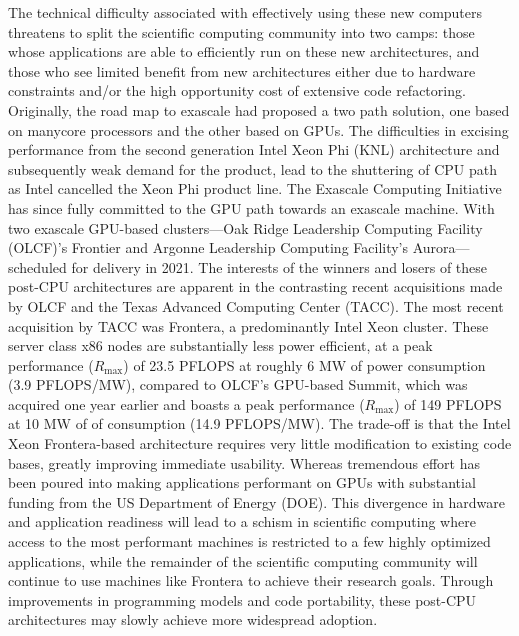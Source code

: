 The technical difficulty associated with effectively using these new computers threatens to split the scientific computing community into two camps: those whose applications are able to efficiently run on these new architectures, and those who see limited benefit from new architectures either due to hardware constraints and/or the high opportunity cost of extensive code refactoring. Originally, the road map to exascale had proposed a two path solution, one based on manycore processors and the other based on GPUs. The difficulties in excising performance from the second generation Intel Xeon Phi (KNL) architecture and subsequently weak demand for the product, lead to the shuttering of CPU path as Intel cancelled the Xeon Phi product line. The Exascale Computing Initiative has since fully committed to the GPU path towards an exascale machine. With two exascale GPU-based clusters---Oak Ridge Leadership Computing Facility (OLCF)'s Frontier and Argonne Leadership Computing Facility's Aurora---scheduled for delivery in 2021. The interests of the winners and losers of these post-CPU architectures are apparent in the contrasting recent acquisitions made by OLCF and the Texas Advanced Computing Center (TACC). The most recent acquisition by TACC was Frontera, a predominantly Intel Xeon cluster. These server class x86 nodes are substantially less power efficient, at a peak performance ($R_{\max}$) of 23.5 PFLOPS at roughly 6 MW of power consumption (3.9 PFLOPS/MW), compared to OLCF's GPU-based Summit, which was acquired one year earlier and boasts a peak performance ($R_{\max}$) of 149 PFLOPS at 10 MW of of consumption (14.9 PFLOPS/MW). The trade-off is that the Intel Xeon Frontera-based architecture requires very little modification to existing code bases, greatly improving immediate usability. Whereas tremendous effort has been poured into making applications performant on GPUs with substantial funding from the US Department of Energy (DOE). This divergence in hardware and application readiness will lead to a schism in scientific computing where access to the most performant machines is restricted to a few highly optimized applications, while the remainder of the scientific computing community will continue to use machines like Frontera to achieve their research goals. Through improvements in programming models and code portability, these post-CPU architectures may slowly achieve more widespread adoption.

